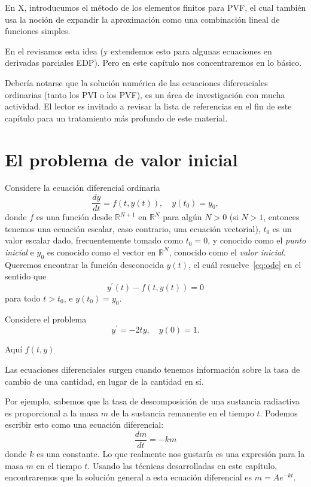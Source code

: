 En X, %
introducumos el método de los elementos finitos para PVF, el cual también usa la noción de expandir la aproximación como una combinación lineal de funciones simples. 

En el %
revisamos esta idea (y extendemos esto para algunas ecuaciones en derivadas parciales EDP). Pero en este capítulo nos concentraremos en lo básico.

Debería notarse que la solución numérica de las ecuaciones diferenciales ordinarias (tanto los PVI o los PVF), es un área de investigación con mucha actividad. El lector es invitado a revisar la lista de referencias en el fin de este capítulo para un tratamiento más profundo de este material.

\section{El problema de valor inicial}
Considere la ecuación diferencial ordinaria
\begin{equation}\label{eq:ode}
\frac{dy}{dt}=f\left(t,y\left(t\right)\right),\quad y\left(t_{0}\right)=y_{0},
\end{equation}
 donde $f$ es una función desde $\mathds{R}^{N+1}$ en $\mathds{R}^{N}$ para algún  $N>0$ (si $N>1$, entonces tenemos una ecuación escalar, caso contrario, una ecuación vectorial), $t_{0}$ es un valor escalar dado, frecuentemente tomado como $t_{0}=0$, y conocido como el \emph{punto inicial} e $y_{0}$ es conocido como el vector en $\mathds{R}^{N}$, conocido como el \emph{valor inicial}. Queremos encontrar la función desconocida $y\left(t\right)$, el cuál resuelve~\eqref{eq:ode} en el sentido que \[ y^{\prime}\left(t\right)-f\left(t,y\left(t\right)\right)=0 \] para todo $t>t_{0}$, e $y\left(t_{0}\right)=y_{0}$.
 
\begin{example}
	Considere el problema \[ y^{\prime}=-2ty,\quad y\left(0\right)=1. \]
\end{example}
Aquí $f\left(t,y\right)$



\newpage

Las ecuaciones diferenciales surgen cuando tenemos información sobre la tasa de cambio de una cantidad, en lugar de la cantidad en sí.

Por ejemplo, sabemos que la tasa de descomposición de una sustancia radiactiva es proporcional a la masa $m$ de la sustancia remanente en el tiempo $t$. Podemos escribir esto como una ecuación diferencial:
\[ \frac{dm}{dt}=-km \]
donde $k$ es una constante. Lo que realmente nos gustaría es una expresión para la masa $m$ en el tiempo $t$. Usando las técnicas desarrolladas en este capítulo, encontraremos que la solución general a esta ecuación diferencial es $m=Ae^{-kt}$.

